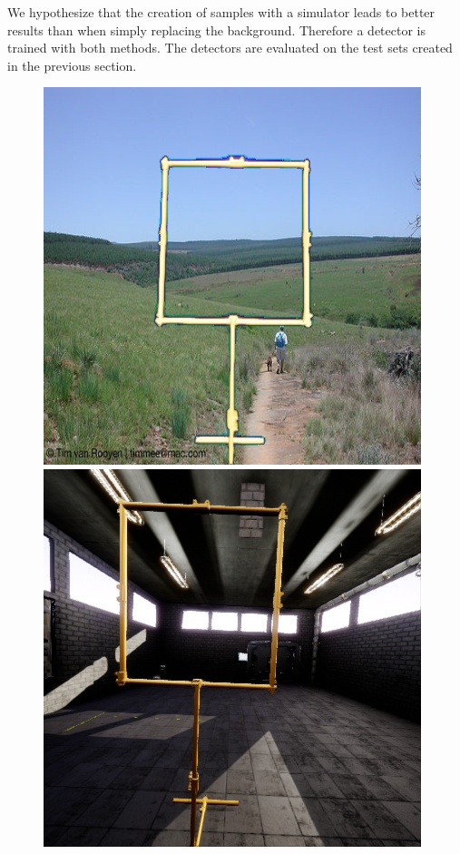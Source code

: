 We hypothesize that the creation of samples with a simulator leads to better results than when simply replacing the background. Therefore a detector is trained with both methods. The detectors are evaluated on the test sets created in the previous section.

\begin{figure}[hbtp]
	\centering
	\begin{minipage}{0.3\textwidth}
		\includegraphics[width=\textwidth]{fig/voc}
	\end{minipage}
	\begin{minipage}{0.3\textwidth}
		\includegraphics[width=\textwidth]{fig/sim}

\end{minipage}
\end{figure}
